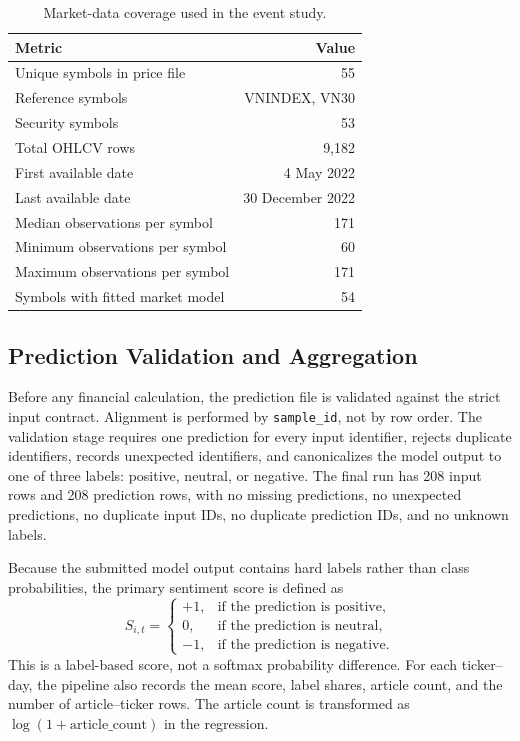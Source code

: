 \begin{table}[htbp]
\centering
\caption{Market-data coverage used in the event study.}
\label{tab:market-coverage}
\begin{tabular}{lr}
\toprule
\textbf{Metric} & \textbf{Value} \\
\midrule
Unique symbols in price file & 55 \\
Reference symbols & VNINDEX, VN30 \\
Security symbols & 53 \\
Total OHLCV rows & 9,182 \\
First available date & 4 May 2022 \\
Last available date & 30 December 2022 \\
Median observations per symbol & 171 \\
Minimum observations per symbol & 60 \\
Maximum observations per symbol & 171 \\
Symbols with fitted market model & 54 \\
\bottomrule
\end{tabular}
\end{table}

\subsection{Prediction Validation and Aggregation}
\label{subsec:prediction-validation}

Before any financial calculation, the prediction file is validated against the strict input contract. Alignment is performed by \texttt{sample\_id}, not by row order. The validation stage requires one prediction for every input identifier, rejects duplicate identifiers, records unexpected identifiers, and canonicalizes the model output to one of three labels: positive, neutral, or negative. The final run has 208 input rows and 208 prediction rows, with no missing predictions, no unexpected predictions, no duplicate input IDs, no duplicate prediction IDs, and no unknown labels.

Because the submitted model output contains hard labels rather than class probabilities, the primary sentiment score is defined as
\[
 S_{i,t}=\begin{cases}
 +1, & \text{if the prediction is positive},\\
 0, & \text{if the prediction is neutral},\\
 -1, & \text{if the prediction is negative}.
 \end{cases}
\]
This is a label-based score, not a softmax probability difference. For each ticker--day, the pipeline also records the mean score, label shares, article count, and the number of article--ticker rows. The article count is transformed as $\log(1+\text{article\_count})$ in the regression.

